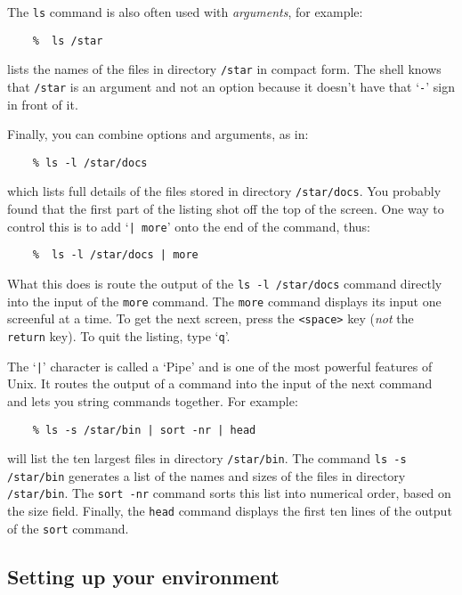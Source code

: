 The {\tt ls} command is also often used with {\em arguments}, for example:
\begin{verbatim}
    %  ls /star
\end{verbatim}
lists the names of the files in directory {\tt /star} in compact form.
The shell knows that {\tt /star} is an argument and not an option because it
doesn't have that `{\tt -}' sign in front of it.

Finally, you can combine options and arguments, as in:
\begin{verbatim}
    % ls -l /star/docs
\end{verbatim}
which lists full details of the files stored in directory {\tt /star/docs}.
You probably found that the first part of the listing shot off the top of the
screen.
One way to control this is to add `{\tt | more}' onto the end of the command,
thus:
\begin{verbatim}
    %  ls -l /star/docs | more
\end{verbatim}
What this does is route the output of the {\tt ls -l /star/docs} command
directly into the input of the {\tt more} command.
The {\tt more} command displays its input one screenful at a time.
To get the next screen, press the {\tt <space>} key ({\em not}\/ the
{\tt return} key).
To quit the listing, type `{\tt q}'.

The `{\tt |}' character is called a `Pipe' and is one of the most powerful
features of Unix.
It routes the output of a command into the input of the next command and lets
you string commands together.
For example:
\begin{verbatim}
    % ls -s /star/bin | sort -nr | head
\end{verbatim}
will list the ten largest files in directory {\tt /star/bin}.
The command {\tt ls -s /star/bin} generates a list of the names and sizes of the
files in directory {\tt /star/bin}.
The {\tt sort -nr} command sorts this list into numerical order, based on
the size field.
Finally, the {\tt head} command displays the first ten lines of the output of
the {\tt sort} command.

\subsection{Setting up your environment\label{suye}}

